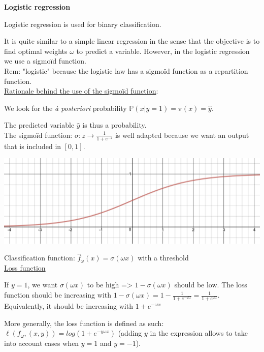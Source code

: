 {\fontsize{12pt}{22pt} \textbf{Logistic regression}\par}

\vspace{5mm}

Logistic regression is used for binary classification.

It is quite similar to a simple linear regression in the sense that the objective is to find optimal weights $\omega$ to predict a variable. However, in the logistic regression we use a sigmoïd function.\\

Rem: "logistic" because the logistic law has a sigmoïd function as a repartition function.\\

\underline{Rationale behind the use of the sigmoïd function}:

We look for the \textit{à posteriori} probability $\mathbb{P}(x | y=1) = \pi (x) = \hat{y}$.

The predicted variable $\hat{y}$ is thus a probability.  \\

The sigmoïd function: $\sigma: z \to \frac{1}{1+e^{-z}}$ is well adapted because we want an output that is included in $[0,1]$.

\begin{center}
\includegraphics[scale=0.15]{sigmoid.png}
\end{center}

Classification function: $\widehat{f}_{\omega}(x) = \sigma(\omega x)$ with a threshold \\

\underline{Loss function}

If $y = 1$, we want $\sigma(\omega x)$ to be high => $1 - \sigma(\omega x)$ should be low. The loss function should be increasing with $1 - \sigma(\omega x) = 1 - \frac{1}{1+e^{-\omega x}} = \frac{1}{1+e^{\omega x}}$. Equivalently, it should be increasing with $1 + e^{-\omega x}$

More generally, the loss function is defined as such: $\ell(f_{\omega}, (x,y)) = log(1 + e^{-y \omega x})$ (adding $y$ in the expression allows to take into account cases when $y = 1$ and $y = -1$).

